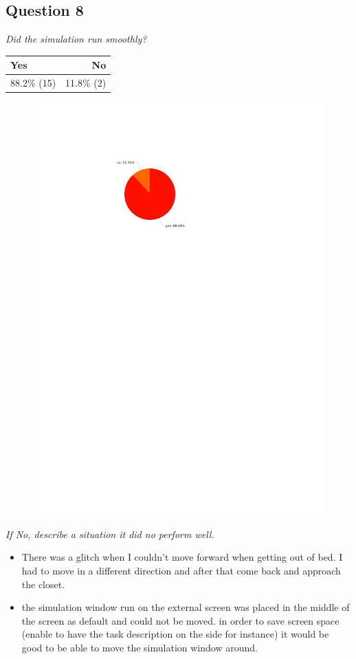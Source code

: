\subsection{Question 8}\label{question1:8}
\emph{Did the simulation run smoothly?}
\begin{table}[H]
	\begin{center}
		\small \begin{tabular*}{0.35\columnwidth}{lr}
			\\ \hline \hline
			Yes & No \\ \hline \hline

		 	88.2\% (15) & 11.8\% (2)\\ \hline
		\end{tabular*}
	\end{center}
\end{table}

\begin{figure}[H]
	\centering
	\includegraphics[width=0.6\linewidth]{gfx/Chapter_EvaluationResults/ALFTask/question8}
\end{figure}

\emph{If No, describe a situation it did no perform well.}
\begin{itemize}
	\item There was a glitch when I couldn't move forward when getting out of bed. I had to move in a different direction and after that come back and approach the closet.
	\item the simulation window run on the external screen was placed in the middle of the screen as default and could not be moved. in order to save screen space (enable to have the task description on the side for instance) it would be good to be able to move the simulation window around.
\end{itemize}

